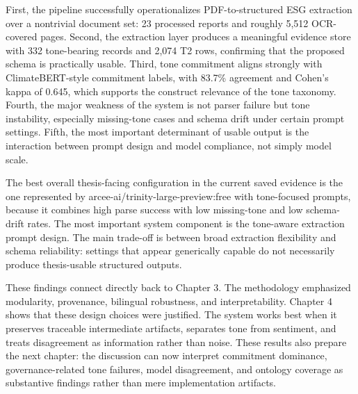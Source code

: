 First, the pipeline successfully operationalizes PDF-to-structured ESG extraction over a nontrivial document set: 23 processed reports and roughly 5,512 OCR-covered pages. Second, the extraction layer produces a meaningful evidence store with 332 tone-bearing records and 2,074 T2 rows, confirming that the proposed schema is practically usable. Third, tone commitment aligns strongly with ClimateBERT-style commitment labels, with 83.7\% agreement and Cohen’s kappa of 0.645, which supports the construct relevance of the tone taxonomy. Fourth, the major weakness of the system is not parser failure but tone instability, especially missing-tone cases and schema drift under certain prompt settings. Fifth, the most important determinant of usable output is the interaction between prompt design and model compliance, not simply model scale.

The best overall thesis-facing configuration in the current saved evidence is the one represented by arcee-ai/trinity-large-preview:free with tone-focused prompts, because it combines high parse success with low missing-tone and low schema-drift rates. The most important system component is the tone-aware extraction prompt design. The main trade-off is between broad extraction flexibility and schema reliability: settings that appear generically capable do not necessarily produce thesis-usable structured outputs.

These findings connect directly back to Chapter 3. The methodology emphasized modularity, provenance, bilingual robustness, and interpretability. Chapter 4 shows that these design choices were justified. The system works best when it preserves traceable intermediate artifacts, separates tone from sentiment, and treats disagreement as information rather than noise. These results also prepare the next chapter: the discussion can now interpret commitment dominance, governance-related tone failures, model disagreement, and ontology coverage as substantive findings rather than mere implementation artifacts.
